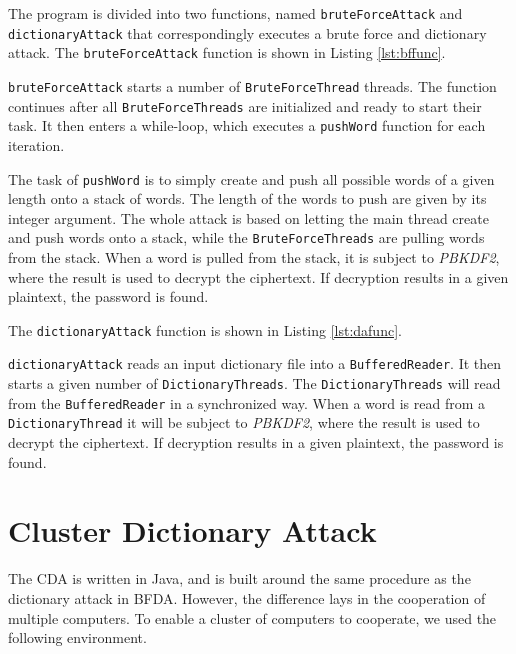 \documentclass[pdftex,english,10pt,b5paper,twoside]{book}
\begin{document}
The program is divided into two functions, named \texttt{bruteForceAttack} and
\texttt{dictionaryAttack} that correspondingly executes a brute force and
dictionary attack. The \texttt{bruteForceAttack} function is shown in Listing
\ref{lst:bffunc}.



\texttt{bruteForceAttack} starts a number of \texttt{BruteForceThread} threads.
The function continues after all \texttt{BruteForceThreads} are initialized and
ready to start their task. It then enters a while-loop, which executes a
\texttt{pushWord} function for each iteration.

The task of \texttt{pushWord} is to simply create and push all possible words
of a given length onto a stack of words. The length of the words to push are
given by its integer argument. The whole attack is based on letting the main
thread create and push words onto a stack, while the \texttt{BruteForceThreads} are
pulling words from the stack. When a word is pulled from the stack, it is
subject to \emph{PBKDF2}, where the result is used to decrypt the ciphertext. If
decryption results in a given plaintext, the password is found.

The \texttt{dictionaryAttack} function is shown in Listing \ref{lst:dafunc}.



\texttt{dictionaryAttack} reads an input dictionary file into a
\texttt{BufferedReader}. It then starts a given number of
\texttt{DictionaryThreads}. The \texttt{DictionaryThreads} will read from the
\texttt{BufferedReader} in a synchronized way. When a word is read from a
\texttt{DictionaryThread} it will be subject to \emph{PBKDF2}, where the result is
used to decrypt the ciphertext. If decryption results in a given plaintext, the
password is found.

\section{Cluster Dictionary Attack}

The \ac{CDA} is written in Java, and is built around the same procedure as the
dictionary attack in \ac{BFDA}. However, the difference lays in the cooperation
of multiple computers. To enable a cluster of computers to cooperate, we used
the following environment.
\end{document}
